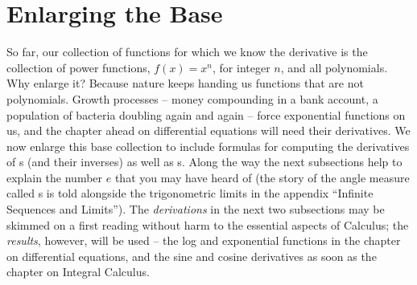 \section{Enlarging the Base}
So far, our collection of functions for which we know the derivative is the collection of power functions, $f(x) = x^n$, for integer
$n$, and all polynomials.
Why enlarge it? Because nature keeps handing us functions that are not
polynomials. Growth processes -- money compounding in a bank account,
a population of bacteria doubling again and again -- force exponential
functions on us, and the chapter ahead on differential equations will
need their derivatives.
We now enlarge this base collection to include formulas for computing the
derivatives of s (and their inverses) as well as
s. Along the way the next subsections help to
explain the number $e$ that you may have heard of (the story of the angle
measure called s is told alongside the trigonometric limits in
the appendix ``Infinite Sequences and Limits'').
The {\it derivations\/} in the next two subsections may be skimmed on a
first reading without harm to the essential aspects of Calculus; the
{\it results\/}, however, will be used -- the log and exponential functions
in the chapter on differential equations, and the sine and cosine
derivatives as soon as the chapter on Integral Calculus.

